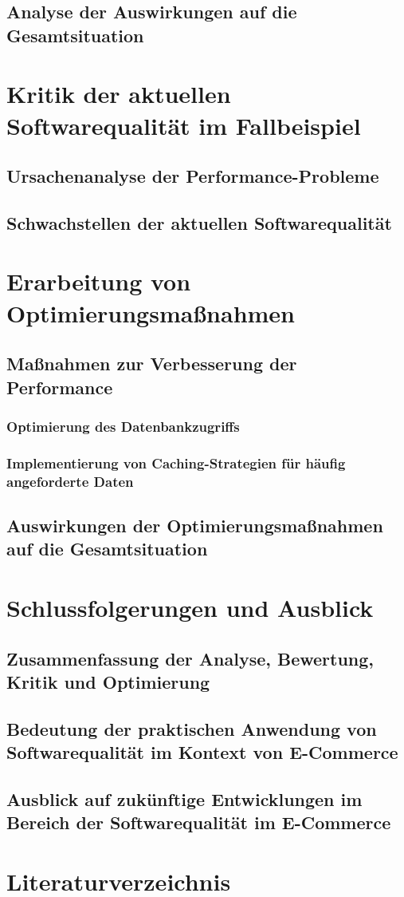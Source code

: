 \documentclass{article}
\begin{document}
\subsection{Analyse der Auswirkungen auf die Gesamtsituation}

\section{Kritik der aktuellen Softwarequalität im Fallbeispiel}
\subsection{Ursachenanalyse der Performance-Probleme}
\subsection{Schwachstellen der aktuellen Softwarequalität}

\section{Erarbeitung von Optimierungsmaßnahmen}
\subsection{Maßnahmen zur Verbesserung der Performance}
\subsubsection{Optimierung des Datenbankzugriffs}
\subsubsection{Implementierung von Caching-Strategien für häufig angeforderte Daten}
\subsection{Auswirkungen der Optimierungsmaßnahmen auf die Gesamtsituation}

\section{Schlussfolgerungen und Ausblick}
\subsection{Zusammenfassung der Analyse, Bewertung, Kritik und Optimierung}
\subsection{Bedeutung der praktischen Anwendung von Softwarequalität im Kontext von E-Commerce}
\subsection{Ausblick auf zukünftige Entwicklungen im Bereich der Softwarequalität im E-Commerce}

\section{Literaturverzeichnis}
\printbibliography[title={quellen.tex}]
\end{document}
